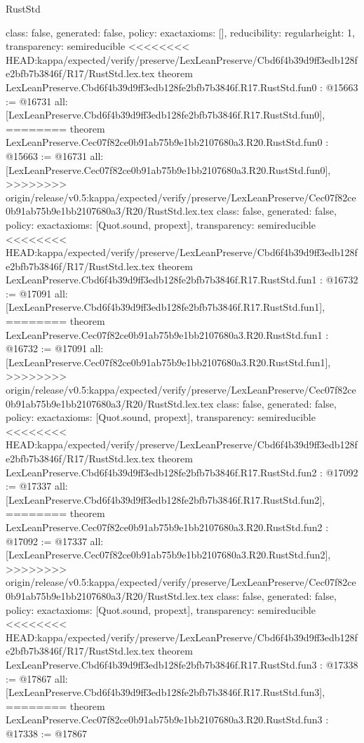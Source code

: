 \begin{lexlean}{RustStd}
\begin{coremodule}
{\begin{coremodule}
{{{  class: false,
  generated: false,
  policy: exact{axioms: []},
  reducibility: regular{height: 1},
  transparency: semireducible
}
<<<<<<<< HEAD:kappa/expected/verify/preserve/LexLeanPreserve/Cbd6f4b39d9ff3edb128fe2bfb7b3846f/R17/RustStd.lex.tex
theorem LexLeanPreserve.Cbd6f4b39d9ff3edb128fe2bfb7b3846f.R17.RustStd.fun0 : @15663 := @16731 {
  all: [LexLeanPreserve.Cbd6f4b39d9ff3edb128fe2bfb7b3846f.R17.RustStd.fun0],
========
theorem LexLeanPreserve.Cec07f82ce0b91ab75b9e1bb2107680a3.R20.RustStd.fun0 : @15663 := @16731 {
  all: [LexLeanPreserve.Cec07f82ce0b91ab75b9e1bb2107680a3.R20.RustStd.fun0],
>>>>>>>> origin/release/v0.5:kappa/expected/verify/preserve/LexLeanPreserve/Cec07f82ce0b91ab75b9e1bb2107680a3/R20/RustStd.lex.tex
  class: false,
  generated: false,
  policy: exact{axioms: [Quot.sound, propext]},
  transparency: semireducible
}
<<<<<<<< HEAD:kappa/expected/verify/preserve/LexLeanPreserve/Cbd6f4b39d9ff3edb128fe2bfb7b3846f/R17/RustStd.lex.tex
theorem LexLeanPreserve.Cbd6f4b39d9ff3edb128fe2bfb7b3846f.R17.RustStd.fun1 : @16732 := @17091 {
  all: [LexLeanPreserve.Cbd6f4b39d9ff3edb128fe2bfb7b3846f.R17.RustStd.fun1],
========
theorem LexLeanPreserve.Cec07f82ce0b91ab75b9e1bb2107680a3.R20.RustStd.fun1 : @16732 := @17091 {
  all: [LexLeanPreserve.Cec07f82ce0b91ab75b9e1bb2107680a3.R20.RustStd.fun1],
>>>>>>>> origin/release/v0.5:kappa/expected/verify/preserve/LexLeanPreserve/Cec07f82ce0b91ab75b9e1bb2107680a3/R20/RustStd.lex.tex
  class: false,
  generated: false,
  policy: exact{axioms: [Quot.sound, propext]},
  transparency: semireducible
}
<<<<<<<< HEAD:kappa/expected/verify/preserve/LexLeanPreserve/Cbd6f4b39d9ff3edb128fe2bfb7b3846f/R17/RustStd.lex.tex
theorem LexLeanPreserve.Cbd6f4b39d9ff3edb128fe2bfb7b3846f.R17.RustStd.fun2 : @17092 := @17337 {
  all: [LexLeanPreserve.Cbd6f4b39d9ff3edb128fe2bfb7b3846f.R17.RustStd.fun2],
========
theorem LexLeanPreserve.Cec07f82ce0b91ab75b9e1bb2107680a3.R20.RustStd.fun2 : @17092 := @17337 {
  all: [LexLeanPreserve.Cec07f82ce0b91ab75b9e1bb2107680a3.R20.RustStd.fun2],
>>>>>>>> origin/release/v0.5:kappa/expected/verify/preserve/LexLeanPreserve/Cec07f82ce0b91ab75b9e1bb2107680a3/R20/RustStd.lex.tex
  class: false,
  generated: false,
  policy: exact{axioms: [Quot.sound, propext]},
  transparency: semireducible
}
<<<<<<<< HEAD:kappa/expected/verify/preserve/LexLeanPreserve/Cbd6f4b39d9ff3edb128fe2bfb7b3846f/R17/RustStd.lex.tex
theorem LexLeanPreserve.Cbd6f4b39d9ff3edb128fe2bfb7b3846f.R17.RustStd.fun3 : @17338 := @17867 {
  all: [LexLeanPreserve.Cbd6f4b39d9ff3edb128fe2bfb7b3846f.R17.RustStd.fun3],
========
theorem LexLeanPreserve.Cec07f82ce0b91ab75b9e1bb2107680a3.R20.RustStd.fun3 : @17338 := @17867 {
}}}}}}}
\end{coremodule}}
\end{coremodule}
\end{lexlean}
